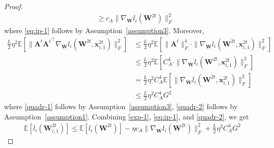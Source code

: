 \begin{proof}
\begin{align}
    & \geq  c_A \| \nabla_{\mathbf{W}} l_i(\mathbf{W}^{2t})  \|_F^2 \label{eq:ip-1}
\end{align}
where \eqref{eq:ip-1} follows by Assumption~\ref{assumption3}. Moreover,
\begin{align}
    \frac{L}{2} \eta^2  \mathbb{E}[\|  \mathbf{A}^t {\mathbf{A}^t}^\top \nabla_{\mathbf{W}} l_i(\mathbf{W}^{2t},\mathbf{x}_{i,1}^{2t}) \|_F^2 ] &\leq  \frac{L}{2} \eta^2  \mathbb{E}[\| \mathbf{A}^t\|_F^4 \cdot \|\nabla_{\mathbf{W}} l_i(\mathbf{W}^{2t},\mathbf{x}_{i,1}^{2t})\|_F^2] \label{quadr-1} \\
    &  \leq \frac{L}{2} \eta^2  \mathbb{E}[C_A^4 \cdot \|\nabla_{\mathbf{W}}  l_i(\mathbf{W}^{2t},\mathbf{x}_{i,1}^{2t})\|_F^2] \\
    & =  \frac{L}{2} \eta^2 C_A^4\mathbb{E}[ \|\nabla_{\mathbf{W}} l_i(\mathbf{W}^{2t},\mathbf{x}_{i,1}^{2t})\|_F^2] \\
    & \leq \frac{L}{2} \eta^2 C_A^4 G^2 \label{quadr-2}
\end{align}
where \eqref{quadr-1} follows by Assumption~\ref{assumption3}, \eqref{quadr-2} follows by Assumption~\ref{assumption1}. Combining \eqref{exp-1}, \eqref{eq:ip-1}, and \eqref{quadr-2}, we get
\begin{align}
    \mathbb{E}[l_i(\mathbf{W}_{i,1}^{2t})] \leq \mathbb{E}[ l_i(\mathbf{W}^{2t})] - \eta c_A \| \nabla_{\mathbf{W}} l_i(\mathbf{W}^{2t})  \|_F^2  + \frac{L}{2} \eta^2 C_A^4 G^2 \label{smooth-1-results}
\end{align}


\end{proof}
